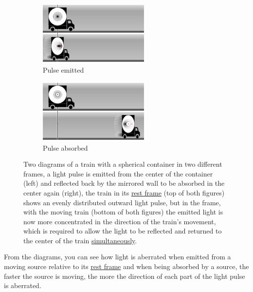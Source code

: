 \begin{figure}[htbp]
	\centering
	\begin{subfigure}{.49\textwidth}
		\centering
		\includegraphics[width=5.5cm]{images/pdf/Aberrated_lorrys_1.pdf}
		\caption{Pulse emitted}
		\label{fig: train aberrated 1}
	\end{subfigure}
	\begin{subfigure}{.49\textwidth}
		\centering
		\includegraphics[width=5.5cm]{images/pdf/Aberrated_lorrys_2.pdf}
		\caption{Pulse absorbed}
		\label{fig: train aberrated 2}
	\end{subfigure}
	\caption{Two diagrams of a train with a spherical container in two different frames, a light pulse is emitted from the center of the container (left) and reflected back by the mirrored wall to be absorbed in the center again (right), the train in its \protect\hyperlink{def-proper-frame}{rest frame} (top of both figures) shows an evenly distributed outward light pulse, but in the frame, with the moving train (bottom of both figures) the emitted light is now more concentrated in the direction of the train's movement, which is required to allow the light to be reflected and returned to the center of the train \protect\hyperlink{def-simultaneity}{simultaneously}.}
	\label{fig: train aberrated}
\end{figure}

%

From the diagrams, you can see how light is aberrated when emitted from a moving source relative to its \hyperlink{def-proper-frame}{rest frame} and when being absorbed by a source, the faster the source is moving, the more the direction of each part of the light pulse is aberrated.

